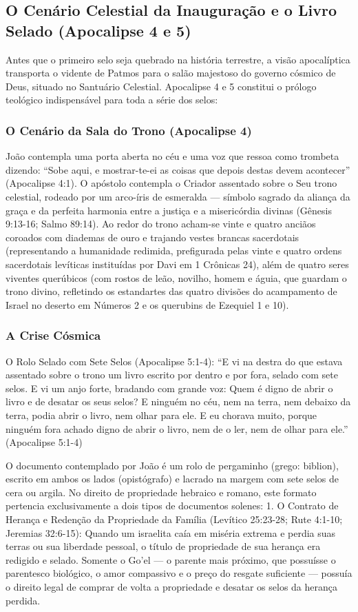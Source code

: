 \documentclass[11pt,a4paper,openany]{book}
\begin{document}
\subsection{O Cenário Celestial da Inauguração e o Livro Selado (Apocalipse 4 e 5)}


Antes que o primeiro selo seja quebrado na história terrestre, a visão apocalíptica transporta o vidente de Patmos para o salão majestoso do governo cósmico de Deus, situado no Santuário Celestial. Apocalipse 4 e 5 constitui o prólogo teológico indispensável para toda a série dos selos:


\subsubsection*{O Cenário da Sala do Trono (Apocalipse 4)}
João contempla uma porta aberta no céu e uma voz que ressoa como trombeta dizendo: ``Sobe aqui, e mostrar-te-ei as coisas que depois destas devem acontecer'' (Apocalipse 4:1). O apóstolo contempla o Criador assentado sobre o Seu trono celestial, rodeado por um arco-íris de esmeralda — símbolo sagrado da aliança da graça e da perfeita harmonia entre a justiça e a misericórdia divinas (Gênesis 9:13-16; Salmo 89:14). Ao redor do trono acham-se vinte e quatro anciãos coroados com diademas de ouro e trajando vestes brancas sacerdotais (representando a humanidade redimida, prefigurada pelas vinte e quatro ordens sacerdotais levíticas instituídas por Davi em 1 Crônicas 24), além de quatro seres viventes querúbicos (com rostos de leão, novilho, homem e águia, que guardam o trono divino, refletindo os estandartes das quatro divisões do acampamento de Israel no deserto em Números 2 e os querubins de Ezequiel 1 e 10).


\subsubsection*{A Crise Cósmica}
O Rolo Selado com Sete Selos (Apocalipse 5:1-4):
``E vi na destra do que estava assentado sobre o trono um livro escrito por dentro e por fora, selado com sete selos. E vi um anjo forte, bradando com grande voz: Quem é digno de abrir o livro e de desatar os seus selos? E ninguém no céu, nem na terra, nem debaixo da terra, podia abrir o livro, nem olhar para ele. E eu chorava muito, porque ninguém fora achado digno de abrir o livro, nem de o ler, nem de olhar para ele.'' (Apocalipse 5:1-4)

O documento contemplado por João é um rolo de pergaminho (grego: biblion), escrito em ambos os lados (opistógrafo) e lacrado na margem com sete selos de cera ou argila. No direito de propriedade hebraico e romano, este formato pertencia exclusivamente a dois tipos de documentos solenes:
1. O Contrato de Herança e Redenção da Propriedade da Família (Levítico 25:23-28; Rute 4:1-10; Jeremias 32:6-15): Quando um israelita caía em miséria extrema e perdia suas terras ou sua liberdade pessoal, o título de propriedade de sua herança era redigido e selado. Somente o Go'el — o parente mais próximo, que possuísse o parentesco biológico, o amor compassivo e o preço do resgate suficiente — possuía o direito legal de comprar de volta a propriedade e desatar os selos da herança perdida.
\end{document}
